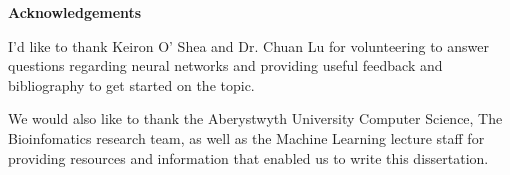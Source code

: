 \thispagestyle{empty}

\begin{center}
    {\LARGE\bf Acknowledgements}
\end{center}

I'd like to thank Keiron O' Shea and Dr. Chuan Lu for volunteering to answer questions regarding neural networks and providing useful feedback and bibliography to get started on the topic.

We would also like to thank the Aberystwyth University Computer Science, The Bioinfomatics research team, as well as the Machine Learning lecture staff for providing resources and information that enabled us to write this dissertation.